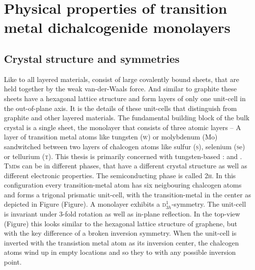 \chapter{Physical properties of transition metal dichalcogenide monolayers}

\section{Crystal structure and symmetries}

Like to all layered materials, \tmds consist of large covalently bound sheets, that are held together by the weak van-der-Waals force. And similar to graphite these sheets have a hexagonal lattice structure and form layers of only one unit-cell in the out-of-plane axis. It is the details of these unit-cells that distinguish \tmds from graphite and other layered materials. The fundamental building block of the bulk crystal is a single sheet, the monolayer that consists of three atomic layers -- A layer of transition metal atoms like tungsten (\textsc{w}) or molybdenum (\textsc{M}{\footnotesize o}) sandwitched between two layers of chalcogen atoms like sulfur (\textsc{s}), selenium (\textsc{s}{\footnotesize e}) or tellurium (\textsc{t}). This thesis is primarily concerned with tungsten-based \tmds\-: \wse and \ws. \textsc{Tmd}s can be in different phases, that have a different crystal structure as well as different electronic properties. The semiconducting phase is called 2\textsc{h}. In this configuration every transition-metal atom has six neigbouring chalcogen atoms and forms a trigonal prismatic unit-cell, with the transition-metal in the center as depicted in Figure (Figure). A \tmdg monolayer exhibits a \textsc{d}$^1_{3h}$-symmetry. The unit-cell is invariant under 3-fold rotation as well as in-plane reflection. In the top-view (Figure) this looks similar to the hexagonal lattice structure of graphene, but with the key difference of a broken inversion symmetry. When the unit-cell is inverted with the transistion metal atom as its inversion center, the chalcogen atoms wind up in empty locations and so they to with any possible inversion point. 